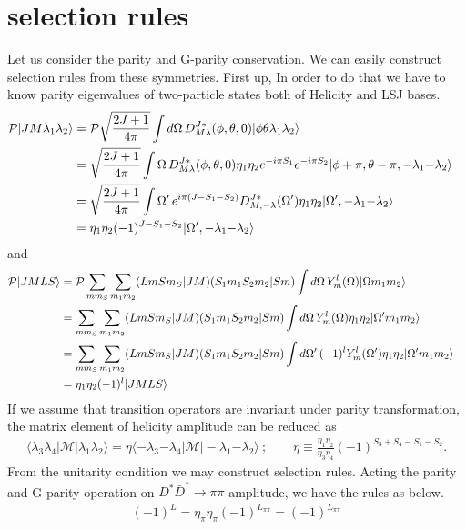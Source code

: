 \documentclass[aps,prd,preprintnumbers,showpacs,showkeys,nofootinbib,
superscriptaddress,fleqn,floatfix,tightenlines, 10pt]{revtex4-1}
\begin{document}
\section{selection rules}
Let us consider the parity and G-parity conservation. We can easily construct
selection rules from these symmetries. First up, In order to do that we have to
know parity eigenvalues of two-particle states both of Helicity and LSJ bases.
\begin{align} \label{parity_twopar_Hel}
	\mathcal{P} |JM \lambda_1 \lambda_2 \rangle &= \mathcal{P}
	\sqrt{\frac{2J+1}{4\pi}} \int d\Omega\, D^{J*}_{M\lambda} (\phi,\theta,0)
	|\phi \theta \lambda_1 \lambda_2 \rangle \cr
	&= \sqrt{\frac{2J+1}{4\pi}} \int \Omega\, D^{J*}_{M\lambda}  (\phi, \theta, 0)
	\eta_1 \eta_2 e^{-i\pi S_1} e^{-i \pi S_2}
	|\phi + \pi, \theta - \pi,-\lambda_1 {-\lambda_2} \rangle \cr
	&= \sqrt{\frac{2J+1}{4\pi}} \int \Omega'\, e^{i\pi (J-S_1 -S_2)} D^{J*}_{M,{-\lambda}} (\Omega')
	\eta_1 \eta_2 |\Omega',-\lambda_1 {-\lambda_2} \rangle \cr
	&= \eta_1 \eta_2 (-1)^{J-S_1-S_2} |\Omega', -\lambda_1 {-\lambda_2} \rangle
\end{align}
and
\begin{align} \label{parity_twopar_LSJ}
	\mathcal{P} |JMLS \rangle &= \mathcal{P} \sum_{m m_S} \sum_{m_1 m_2}
	(LmSm_S|JM)(S_1 m_1 S_2 m_2 | S m)
	\int d\Omega\, Y_m^l (\Omega) |\Omega m_1 m_2 \rangle \cr
	&= \sum_{m m_S} \sum_{m_1 m_2}
	(LmSm_S|JM)(S_1 m_1 S_2 m_2 | S m)
	\int d\Omega\, Y_m^l (\Omega)
	\eta_1 \eta_2 |\Omega' m_1 m_2 \rangle \cr
	&= \sum_{m m_S} \sum_{m_1 m_2}
	(LmSm_S|JM)(S_1 m_1 S_2 m_2 | S m)
	\int d\Omega'\, (-1)^l Y_m^l (\Omega')
	\eta_1 \eta_2 |\Omega' m_1 m_2 \rangle  \cr
	&= \eta_1 \eta_2 (-1)^l |JMLS \rangle
\end{align}
If we assume that transition operators are invariant under parity transformation,
the matrix element of helicity amplitude can be reduced as
\begin{align} \label{parity_sel_Hel}
	\langle \lambda_3 \lambda_4 | \mathcal{M} | \lambda_1 \lambda_2 \rangle
	= \eta \langle -\lambda_3 {-\lambda_4} | \mathcal{M} | -\lambda_1 {-\lambda_2} \rangle\ ;
	\qquad
	\eta \equiv \frac{\eta_1 \eta_2}{\eta_3 \eta_4} (-1)^{S_3+S_4-S_1-S_2}.
\end{align}
From the unitarity condition we may construct selection rules.
Acting the parity and G-parity operation on
$D^* \bar{D}^* \rightarrow \pi\pi$ amplitude, we have the rules as below.
\begin{align} \label{parity_sel_LSJ}
	(-1)^L = \eta_\pi \eta_\pi (-1)^{L_{\pi\pi}} = (-1)^{L_{\pi\pi}}
\end{align}
\end{document}

